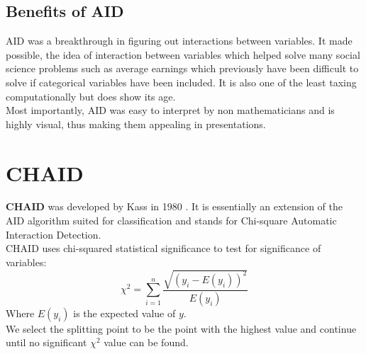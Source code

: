 \documentclass[11pt,a4paper]{report}
\begin{document}
\subsection{Benefits of AID}
AID was a breakthrough in figuring out interactions between variables. It made possible, the idea of interaction between variables which helped solve many social science problems such as average earnings which previously have been difficult to solve if categorical variables have been included.
It is also one of the least taxing computationally but does show its age.
\medskip\\
Most importantly, AID was easy to interpret by non mathematicians and is highly visual, thus making them appealing in presentations.


\section{CHAID}
\textbf{CHAID} was developed by Kass in 1980 \cite{CHAID}.
It is essentially an extension of the AID algorithm suited for classification and stands for Chi-square Automatic Interaction Detection.\\
CHAID uses chi-squared statistical significance to test for significance of variables:
\begin{equation}
    \chi^{2} = \sum_{i = 1}^{n} \frac{\sqrt{(y_{i} - E(y_{i}))^2}}{E(y_{i})}
    \label{eq:chisq}
\end{equation}
Where $E(y_{i})$ is the expected value of $y$.\\
We select the splitting point to be the point with the highest value and continue until no significant $\chi^2$ value can be found.
\end{document}
